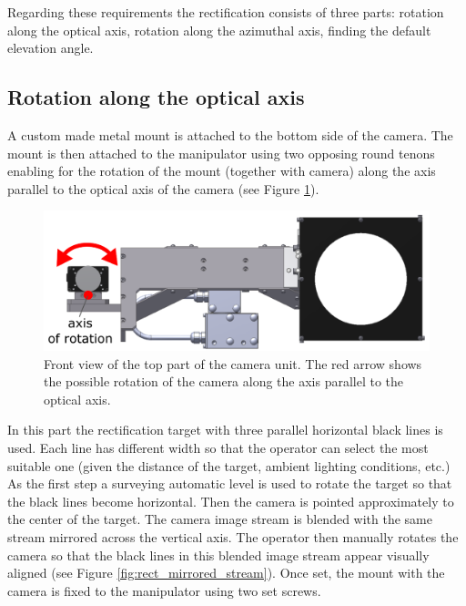 Regarding these requirements the rectification consists of three parts: rotation along the optical axis, rotation along the azimuthal axis, finding the default elevation angle.


\subsection{Rotation along the optical axis}

A custom made metal mount is attached to the bottom side of the camera. The mount is then attached to the manipulator using two opposing round tenons enabling for the rotation of the mount (together with camera) along the axis parallel to the optical axis of the camera (see Figure \ref{fig:rect_model_front_view}).

\begin{figure}[htb]
	\centering
	\includegraphics[width=13cm]{fig/rect_model_front_view.png}
	\caption{Front view of the top part of the camera unit. The red arrow shows the possible rotation of the camera along the axis parallel to the optical axis.}
	\label{fig:rect_model_front_view}
\end{figure}

In this part the rectification target with three parallel horizontal black lines is used. Each line has different width so that the operator can select the most suitable one (given the distance of the target, ambient lighting conditions, etc.) As the first step a surveying automatic level is used to rotate the target so that the black lines become horizontal. Then the camera is pointed approximately to the center of the target. The camera image stream is blended with the same stream mirrored across the vertical axis. The operator then manually rotates the camera so that the black lines in this blended image stream appear visually aligned (see Figure \ref{fig:rect_mirrored_stream}). Once set, the mount with the camera is fixed to the manipulator using two set screws.

